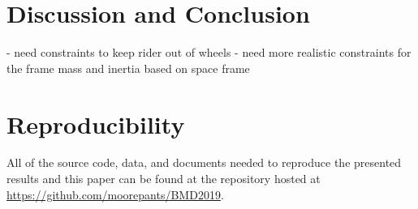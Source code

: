 \documentclass{bmd2019a}
\begin{document}
\section{Discussion and Conclusion}
%
- need constraints to keep rider out of wheels
- need more realistic constraints for the frame mass and inertia based on space
frame
\section{Reproducibility}
%
All of the source code, data, and documents needed to reproduce the presented
results and this paper can be found at the repository hosted at
\url{https://github.com/moorepants/BMD2019}.



\end{document}
